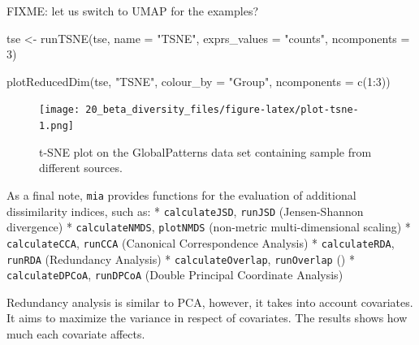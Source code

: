 \documentclass[
]{book}
\newenvironment{Shaded}{\begin{snugshade}}{\end{snugshade}}
\newcommand{\AttributeTok}[1]{\textcolor[rgb]{0.77,0.63,0.00}{#1}}
\newcommand{\DecValTok}[1]{\textcolor[rgb]{0.00,0.00,0.81}{#1}}
\newcommand{\FunctionTok}[1]{\textcolor[rgb]{0.00,0.00,0.00}{#1}}
\newcommand{\NormalTok}[1]{#1}
\newcommand{\OtherTok}[1]{\textcolor[rgb]{0.56,0.35,0.01}{#1}}
\newcommand{\SpecialCharTok}[1]{\textcolor[rgb]{0.00,0.00,0.00}{#1}}
\newcommand{\StringTok}[1]{\textcolor[rgb]{0.31,0.60,0.02}{#1}}
\begin{document}
FIXME: let us switch to UMAP for the examples?

\begin{Shaded}
\begin{Highlighting}[]
\NormalTok{tse }\OtherTok{\textless{}{-}} \FunctionTok{runTSNE}\NormalTok{(tse, }\AttributeTok{name =} \StringTok{"TSNE"}\NormalTok{, }\AttributeTok{exprs\_values =} \StringTok{"counts"}\NormalTok{, }\AttributeTok{ncomponents =} \DecValTok{3}\NormalTok{)}
\end{Highlighting}
\end{Shaded}

\begin{Shaded}
\begin{Highlighting}[]
\FunctionTok{plotReducedDim}\NormalTok{(tse, }\StringTok{"TSNE"}\NormalTok{, }\AttributeTok{colour\_by =} \StringTok{"Group"}\NormalTok{, }\AttributeTok{ncomponents =} \FunctionTok{c}\NormalTok{(}\DecValTok{1}\SpecialCharTok{:}\DecValTok{3}\NormalTok{))}
\end{Highlighting}
\end{Shaded}

\begin{figure}
\centering
\texttt{[image: 20\_beta\_diversity\_files/figure-latex/plot-tsne-1.png]}
\caption{\label{fig:plot-tsne}t-SNE plot on the GlobalPatterns data set containing sample from different sources.}
\end{figure}

As a final note, \texttt{mia} provides functions for the evaluation of additional dissimilarity indices, such as:
* \texttt{calculateJSD}, \texttt{runJSD} (Jensen-Shannon divergence)
* \texttt{calculateNMDS}, \texttt{plotNMDS} (non-metric multi-dimensional scaling)
* \texttt{calculateCCA}, \texttt{runCCA} (Canonical Correspondence Analysis)
* \texttt{calculateRDA}, \texttt{runRDA} (Redundancy Analysis)
* \texttt{calculateOverlap}, \texttt{runOverlap} ()
* \texttt{calculateDPCoA}, \texttt{runDPCoA} (Double Principal Coordinate Analysis)

Redundancy analysis is similar to PCA, however, it takes into account covariates.
It aims to maximize the variance in respect of covariates. The results shows how much
each covariate affects.
\end{document}
